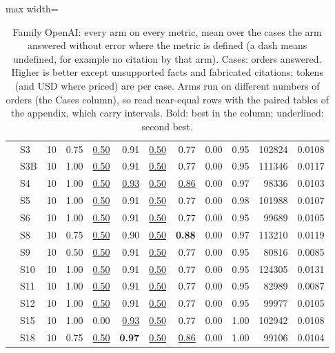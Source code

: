\begin{table}[t]
\begin{adjustbox}{max width=\textwidth}
\begin{tabular}{@{}llrrrrrrrrrr@{}}
 & S3 & 10 & 0.75 & \underline{0.50} & 0.91 & \underline{0.50} & 0.77 & 0.00 & 0.95 & 102824 & 0.0108 \\
 & S3B & 10 & 1.00 & \underline{0.50} & 0.91 & \underline{0.50} & 0.77 & 0.00 & 0.95 & 111346 & 0.0117 \\
 & S4 & 10 & 1.00 & \underline{0.50} & \underline{0.93} & \underline{0.50} & \underline{0.86} & 0.00 & 0.97 & 98336 & 0.0103 \\
 & S5 & 10 & 1.00 & \underline{0.50} & 0.91 & \underline{0.50} & 0.77 & 0.00 & 0.98 & 101988 & 0.0107 \\
 & S6 & 10 & 1.00 & \underline{0.50} & 0.91 & \underline{0.50} & 0.77 & 0.00 & 0.95 & 99689 & 0.0105 \\
 & S8 & 10 & 0.75 & \underline{0.50} & 0.90 & \underline{0.50} & \textbf{0.88} & 0.00 & 0.97 & 113210 & 0.0119 \\
 & S9 & 10 & 0.50 & \underline{0.50} & 0.91 & \underline{0.50} & 0.77 & 0.00 & 0.95 & 80816 & 0.0085 \\
 & S10 & 10 & 1.00 & \underline{0.50} & 0.91 & \underline{0.50} & 0.77 & 0.00 & 0.95 & 124305 & 0.0131 \\
 & S11 & 10 & 1.00 & \underline{0.50} & 0.91 & \underline{0.50} & 0.77 & 0.00 & 0.95 & 82989 & 0.0087 \\
 & S12 & 10 & 1.00 & \underline{0.50} & 0.91 & \underline{0.50} & 0.77 & 0.00 & 0.95 & 99977 & 0.0105 \\
 & S15 & 10 & 1.00 & 0.00 & \underline{0.93} & \underline{0.50} & 0.77 & 0.00 & 1.00 & 102942 & 0.0108 \\
 & S18 & 10 & 0.75 & \underline{0.50} & \textbf{0.97} & \underline{0.50} & \underline{0.86} & 0.00 & 1.00 & 99106 & 0.0104 \\
\bottomrule
\end{tabular}
\end{adjustbox}
\caption{Family OpenAI: every arm on every metric, mean over the cases the arm answered without error where the metric is defined (a dash means undefined, for example no citation by that arm). Cases: orders answered. Higher is better except unsupported facts and fabricated citations; tokens (and USD where priced) are per case. Arms run on different numbers of orders (the Cases column), so read near-equal rows with the paired tables of the appendix, which carry intervals. Bold: best in the column; underlined: second best.}
\label{tab:master_openai}
\end{table}